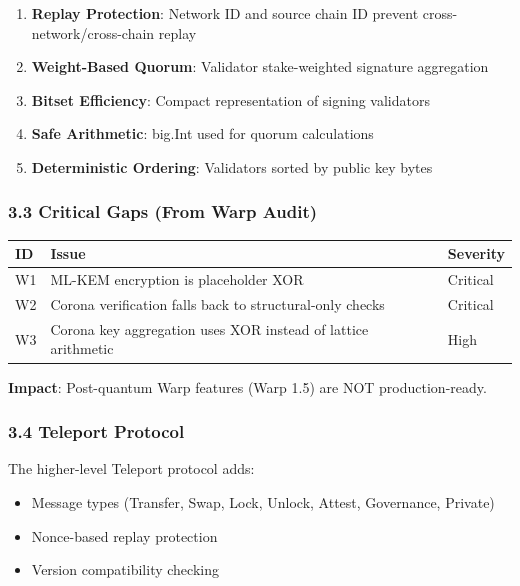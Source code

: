 \documentclass[
]{article}
\newcounter{none} %
\providecommand{\tightlist}{%
  \setlength{\itemsep}{0pt}\setlength{\parskip}{0pt}}
\begin{document}
\begin{enumerate}
\def\labelenumi{\arabic{enumi}.}
\tightlist
\item
  \textbf{Replay Protection}: Network ID and source chain ID prevent
  cross-network/cross-chain replay
\item
  \textbf{Weight-Based Quorum}: Validator stake-weighted signature
  aggregation
\item
  \textbf{Bitset Efficiency}: Compact representation of signing
  validators
\item
  \textbf{Safe Arithmetic}: big.Int used for quorum calculations
\item
  \textbf{Deterministic Ordering}: Validators sorted by public key bytes
\end{enumerate}

\subsubsection{3.3 Critical Gaps (From Warp
Audit)}\label{33-critical-gaps-from-warp-audit}

{\def\LTcaptype{none} %
\begin{longtable}[]{@{}lll@{}}
\toprule\noalign{}
ID & Issue & Severity \\
\midrule\noalign{}
\endhead
\bottomrule\noalign{}
\endlastfoot
W1 & ML-KEM encryption is placeholder XOR & Critical \\
W2 & Corona verification falls back to structural-only checks &
Critical \\
W3 & Corona key aggregation uses XOR instead of lattice arithmetic &
High \\
\end{longtable}
}

\textbf{Impact}: Post-quantum Warp features (Warp 1.5) are NOT
production-ready.

\subsubsection{3.4 Teleport Protocol}\label{34-teleport-protocol}

The higher-level Teleport protocol adds:

\begin{itemize}
\tightlist
\item
  Message types (Transfer, Swap, Lock, Unlock, Attest, Governance,
  Private)
\item
  Nonce-based replay protection
\item
  Version compatibility checking
\end{itemize}
\end{document}

